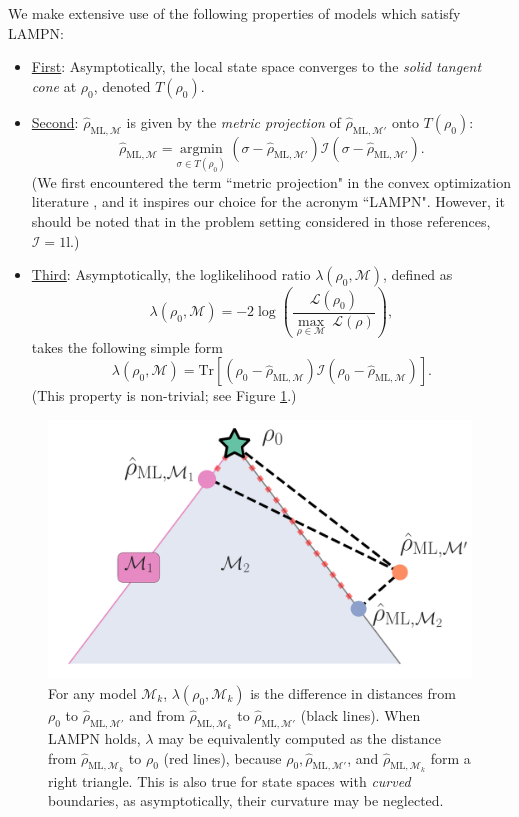 \documentclass[aps,pra, twocolumn]{revtex4-1}
\newcommand{\M}{\mathcal{M}}
\newcommand{\cL}{\mathcal{L}}
\newcommand{\Id}{\mathbb{I}}
\def\Id{1\!\mathrm{l}}
\newcommand{\rhohat}{\hat{\rho}}
\newcommand{\rhoML}[1]{\rhohat_{\scriptscriptstyle{\mathrm{ML},#1}}}
\begin{document}
We make extensive use of the following properties of models which satisfy LAMPN:
\begin{itemize}
\item \underline{First}: Asymptotically, the local state space converges to the \emph{solid tangent cone} at $\rho_{0}$, denoted $T(\rho_{0})$.

\item \underline{Second}: $\rhoML{\M}$ is given by the \emph{metric projection} of $\rhoML{\M'}$ onto $T(\rho_{0})$:
\begin{equation}
\label{eq:lampnmle}
\rhoML{\M} = \underset{\sigma \in T(\rho_{0})}{\text{argmin}}~(\sigma  -\rhoML{\M'})\mathcal{I}(\sigma  -\rhoML{\M'}).
\end{equation}
(We first encountered the term ``metric projection" in the convex optimization literature \cite{McCoy2014, Amelunxen2014}, and it inspires our choice for the acronym ``LAMPN". However, it should be noted that in the problem setting considered in those references, $\mathcal{I} = \Id$.)

\item \underline{Third}: Asymptotically, the loglikelihood ratio $\lambda(\rho_{0}, \M)$, defined as
\[\lambda(\rho_{0}, \M) = -2 \log \left(\frac{\cL(\rho_{0})}{\underset{\rho \in \M}{\max}~\cL(\rho)}\right),\]
takes the following simple form
\begin{equation}
\label{eq:llrs_lan}
\lambda(\rho_{0}, \M) =  \mathrm{Tr}[(\rho_{0} - \rhoML{\M})\mathcal{I}(\rho_{0} - \rhoML{\M})].
\end{equation}
(This property is non-trivial; see Figure \ref{fig:llrs_lampn}.)
\end{itemize}

\begin{figure}
\includegraphics[width=.75\columnwidth]{Images/Figure_temp2.pdf}
 \caption{For any model $\M_{k}$, $\lambda(\rho_{0}, \M_{k})$ is the difference in distances from $\rho_{0}$ to $\rhoML{\M'}$ and from $\rhoML{\M_{k}}$ to $\rhoML{\M'}$ (black lines). When LAMPN holds, $\lambda$ may be equivalently computed as the distance from $\rhoML{\M_{k}}$ to $\rho_{0}$ (red lines), because $\rho_{0}, \rhoML{\M'}$, and $\rhoML{\M_{k}}$ form a right triangle. This is also true for state spaces with \emph{curved} boundaries, as asymptotically, their curvature may be neglected.}
\label{fig:llrs_lampn}
\end{figure}
\end{document}
